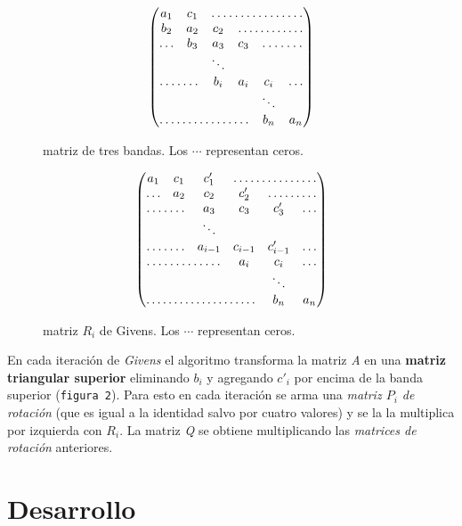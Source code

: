\documentclass[a4paper]{article}
\begin{document}
\begin{multicols}{2}
\begin{figure}[H]
$$
 \begin{pmatrix}
   a_1 & c_1 & \hdotsfor{4} \\
   b_2 & a_2 &  c_2 & \hdotsfor{3} \\
  \hdots & b_3 & a_3 & c_3 & \hdotsfor{2} \\
   & & \ddots \\
   \hdotsfor{2} & b_i & a_i & c_i & \hdots \\
   & & & & \ddots \\
   \hdotsfor{4} & b_n & a_n \\
 \end{pmatrix}
$$
 \caption{matriz de tres bandas. Los $\cdots$ representan ceros.}
\end{figure}

\begin{figure}[H]
$$
 \begin{pmatrix}
   a_1 & c_1 & c'_1 & \hdotsfor{3} \\
   \hdots & a_2 &  c_2 & c'_2 &\hdotsfor{2} \\
   \hdotsfor{2} & a_3 & c_3 & c'_3 & \hdots \\
   & & \ddots \\
   \hdotsfor{2} & a_{i - 1} & c_{i - 1} & c'_{i - 1} & \hdots \\
   \hdotsfor{3} & a_i & c_i & \hdots \\
   & & & & \ddots \\
   \hdotsfor{4} & b_n & a_n \\
 \end{pmatrix}
$$
 \caption{matriz $R_i$ de Givens. Los $\cdots$ representan ceros.}
\end{figure}
\end{multicols}

En cada iteración de \textit{Givens} el algoritmo transforma la matriz \textit{A} en una \textbf{matriz triangular superior} eliminando $b_i$ y agregando $c'_i$ por encima de la banda superior (\texttt{figura 2}). Para esto en cada iteración se arma una \textit{matriz $P_i$ de rotación} (que es igual a la identidad salvo por cuatro valores) y se la la multiplica por izquierda con $R_i$. La matriz \textit{Q} se obtiene multiplicando las \textit{matrices de rotación} anteriores.\\


\section{Desarrollo}
\end{document}
